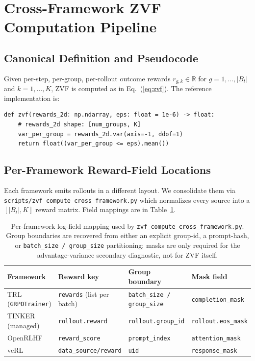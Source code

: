 \section{Cross-Framework ZVF Computation Pipeline}
\label{sec:appendix:zvf-pipeline}

\subsection{Canonical Definition and Pseudocode}

Given per-step, per-group, per-rollout outcome rewards
$r_{g,k} \in \mathbb{R}$ for $g=1,\ldots,|B_t|$ and $k=1,\ldots,K$, ZVF
is computed as in Eq.~(\ref{eq:zvf}). The reference implementation is:
\begin{verbatim}
def zvf(rewards_2d: np.ndarray, eps: float = 1e-6) -> float:
    # rewards_2d shape: [num_groups, K]
    var_per_group = rewards_2d.var(axis=-1, ddof=1)
    return float((var_per_group <= eps).mean())
\end{verbatim}

\subsection{Per-Framework Reward-Field Locations}

Each framework emits rollouts in a different layout. We consolidate them
via \texttt{scripts/zvf\_compute\_cross\_framework.py} which normalizes
every source into a $[|B_t|, K]$ reward matrix. Field mappings are in
Table~\ref{tab:zvf-parser-fields}.

\begin{table}[ht]
\centering
\small
\begin{tabular}{llll}
\toprule
Framework & Reward key & Group boundary & Mask field \\
\midrule
TRL (\texttt{GRPOTrainer})   & \texttt{rewards} (list per batch) & \texttt{batch\_size / group\_size} & \texttt{completion\_mask} \\
TINKER (managed)             & \texttt{rollout.reward}           & \texttt{rollout.group\_id}         & \texttt{rollout.eos\_mask} \\
OpenRLHF                     & \texttt{reward\_score}            & \texttt{prompt\_index}             & \texttt{attention\_mask}   \\
veRL                         & \texttt{data\_source/reward}      & \texttt{uid}                        & \texttt{response\_mask}   \\
\bottomrule
\end{tabular}
\caption{Per-framework log-field mapping used by
\texttt{zvf\_compute\_cross\_framework.py}. Group boundaries are recovered
from either an explicit group-id, a prompt-hash, or
\texttt{batch\_size / group\_size} partitioning; masks are only required
for the advantage-variance secondary diagnostic, not for ZVF itself.}
\label{tab:zvf-parser-fields}
\end{table}

